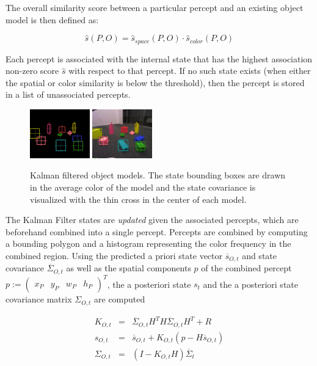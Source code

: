The overall similarity score between a particular percept and an
existing object model is then defined as:

$$\hat{s}(P,O)= \hat{s}_{space}(P,O) \cdot \hat{s}_{color}(P,O)$$

\noindent Each percept is associated with the internal state that has
the highest association non-zero score $\hat{s}$ with respect to that
percept. If no such state exists (when either the spatial or color
similarity is below the threshold), then the percept is stored in a
list of unassociated percepts.

  
\begin{figure}[t]
  \parbox{0.486\textwidth}{%
    \includegraphics[width=0.23\textwidth]{figures/vision-system-object-modeling-1}%
    \hspace{0.025\textwidth}%
    \includegraphics[width=0.23\textwidth]{figures/vision-system-object-modeling-2}}
  \caption{Kalman filtered object models. The state bounding boxes are
    drawn in the average color of the model and the state covariance
    is visualized with the thin cross in the center of each model.}
  \label{f:object-modeling}
\end{figure}

The Kalman Filter states are \emph{updated} given the associated
percepts, which are beforehand combined into a single percept.
Percepts are combined by computing a bounding polygon and a histogram
representing the color frequency in the combined region.  Using the
predicted a priori state vector $\overline{s}_{O,t}$ and state
covariance $\overline{\Sigma}_{O,t}$ as well as the spatial components
$p$ of the combined percept $p:=\begin{pmatrix}x_P&y_P
  &w_P&h_P\end{pmatrix}^T$, the a posteriori state $s_{t}$ and the a
posteriori state covariance matrix $\Sigma_{O,t}$ are computed

\begin{eqnarray*}
  K_{O,t}&=&\overline{\Sigma}_{O,t} H^T H\overline{\Sigma}_{O,t}H^T+R\\
  s_{O,t}&=&\overline{s}_{O,t}+K_{O,t}(p-H\overline{s}_{O,t})\\
  \Sigma_{O,t}&=&(I-K_{O,t}H)\overline{\Sigma}_{t}
\end{eqnarray*}

